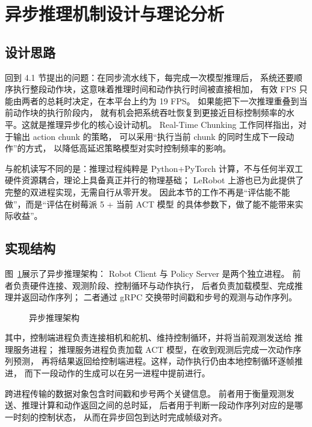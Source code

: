 \section{异步推理机制设计与理论分析}\label{sec:async-inference}

\subsection{设计思路}\label{sec:async-inf-motivation}

回到 4.1 节提出的问题：在同步流水线下，每完成一次模型推理后，
系统还要顺序执行整段动作块，这意味着推理时间和动作执行时间被直接相加，
有效 FPS 只能由两者的总耗时决定，在本平台上约为 19 FPS。
如果能把下一次推理重叠到当前动作块的执行阶段内，
就有机会把系统吞吐恢复到更接近目标控制频率的水平。这就是推理异步化的核心设计动机。
Real-Time Chunking\cite{realtimechunking} 工作同样指出，对于输出 action chunk 的策略，
可以采用“执行当前 chunk 的同时生成下一段动作”的方式，
以降低高延迟策略模型对实时控制频率的影响。

与舵机读写不同的是：推理过程纯粹是 Python+PyTorch
计算，不与任何半双工硬件资源耦合，理论上具备真正并行的物理基础；
LeRobot 上游也已为此提供了完整的双进程实现\cite{smolvla}，无需自行从零开发。
因此本节的工作不再是“评估能不能做”，而是“评估在树莓派 5 + 当前 ACT 模型
的具体参数下，做了能不能带来实际收益”。

\subsection{实现结构}\label{sec:async-inf-arch}

图~\ref{fig:async-inf-arch}展示了异步推理架构：
Robot Client 与 Policy Server 是两个独立进程。
前者负责硬件连接、观测阶段、控制循环与动作执行，
后者负责加载模型、完成推理并返回动作序列；
二者通过 gRPC 交换带时间戳和步号的观测与动作序列。

\begin{figure}[htbp]
  \centering
  
  \caption{异步推理架构}
  \label{fig:async-inf-arch}
\end{figure}

其中，控制端进程负责连接相机和舵机、维持控制循环，并将当前观测发送给
推理服务进程；
推理服务进程负责加载 ACT 模型，在收到观测后完成一次动作序列预测，
再将结果返回给控制端进程。这样，动作执行仍由本地控制循环逐帧推进，
而下一段动作的生成可以在另一进程中提前进行。

跨进程传输的数据对象包含时间戳和步号两个关键信息。
前者用于衡量观测发送、推理计算和动作返回之间的总时延，
后者用于判断一段动作序列对应的是哪一时刻的控制状态，
从而在异步回包到达时完成帧级对齐。

